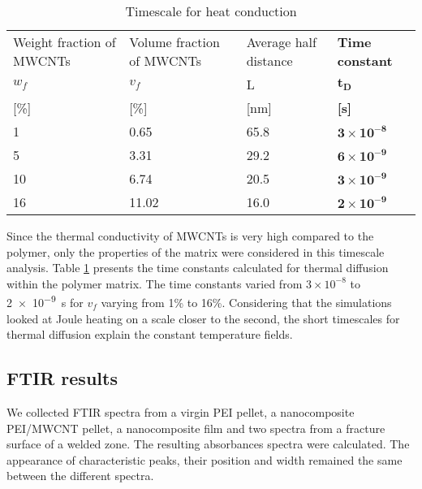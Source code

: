 \begin{table}[htb]
	\centering
	\caption{Timescale for heat conduction}
	\begin{tabular}{@{}p{2.8cm}p{3.0cm}p{2.2cm}p{3.2cm}@{}}
		\toprule
		Weight fraction of MWCNTs & Volume fraction of MWCNTs & Average half distance & \textbf{Time constant}     \\
		$w_f$                     & $v_f$                     & L                     & $\mathbf{t_D}$             \\
		{[}\%{]}                  & {[}\%{]	}                 & {[}nm{]}              & \textbf{{[}s{]}}           \\ \midrule
		1                         & 0.65                      & 65.8                  & $\mathbf{3\times 10^{-8}}$ \\
		5                         & 3.31                      & 29.2                  & $\mathbf{6\times 10^{-9}}$ \\
		10                        & 6.74                      & 20.5                  & $\mathbf{3\times 10^{-9}}$ \\
		16                        & 11.02                     & 16.0                  & $\mathbf{2\times 10^{-9}}$ \\ \bottomrule
	\end{tabular}
	\label{tab:results_timescale}
\end{table}

Since the thermal conductivity of MWCNTs is very high compared to the polymer, only the properties of the matrix were considered in this timescale analysis. 
Table \ref{tab:results_timescale} presents the time constants calculated for thermal diffusion within the polymer matrix. 
The time constants varied from $3 \times 10^{-8}$ to \SI{2e-9}{\second} for $v_f$ varying from 1\% to 16\%. 
Considering that the simulations looked at Joule heating on a scale closer to the second, the short timescales for thermal diffusion explain the constant temperature fields. 

\subsection{FTIR results}

We collected FTIR spectra from a virgin PEI pellet, a nanocomposite PEI/MWCNT pellet, a nanocomposite film and two spectra from a fracture surface of a welded zone. 
The resulting absorbances spectra were calculated. 
The appearance of characteristic peaks, their position and width remained the same between the different spectra. 

